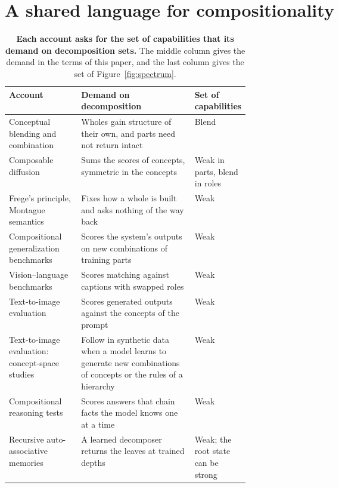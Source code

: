 \documentclass[10pt]{article}
\theoremstyle{plain}
\theoremstyle{remark}
\begin{document}
\section{A shared language for compositionality}
\label{sec:spectrum}

\begin{table}[tp]
  \caption{\textbf{Each account asks for the set of capabilities that its demand on decomposition sets.} The middle column gives the demand in the terms of this paper, and the last column gives the set of Figure~\ref{fig:spectrum}.}
  \label{tab:spectrum}
  \centering\footnotesize
  \begin{tabularx}{\linewidth}{@{}P{0.30\linewidth}YP{0.17\linewidth}@{}}
    \toprule
    Account & Demand on decomposition & Set of capabilities \\
    \midrule
    Conceptual blending and combination \citep{fauconnier2002,osherson1981,kamp1995} & Wholes gain structure of their own, and parts need not return intact & Blend \\
    Composable diffusion \citep{liu2022composable} & Sums the scores of concepts, symmetric in the concepts & Weak in parts, blend in roles \\
    \addlinespace
    Frege's principle, Montague semantics \citep{frege1923,montague1970} & Fixes how a whole is built and asks nothing of the way back & Weak \\
    Compositional generalization benchmarks \citep{lake2018,kim2020cogs,keysers2020,hupkes2020,lake2023} & Scores the system's outputs on new combinations of training parts & Weak \\
    Vision--language benchmarks \citep{thrush2022winoground,yuksekgonul2023} & Scores matching against captions with swapped roles & Weak \\
    Text-to-image evaluation \citep{ramesh2021,huang2023t2i,ghosh2023geneval} & Scores generated outputs against the concepts of the prompt & Weak \\
    Text-to-image evaluation: concept-space studies \citep{okawa2023,park2024hidden,favero2025diffusion} & Follow in synthetic data when a model learns to generate new combinations of concepts or the rules of a hierarchy & Weak \\
    Compositional reasoning tests \citep{dziri2023,press2023} & Scores answers that chain facts the model knows one at a time & Weak \\
    Recursive auto-associative memories \citep{pollack1990} & A learned decomposer returns the leaves at trained depths & Weak; the root state can be strong \\

\end{tabularx}
\end{table}
\end{document}
